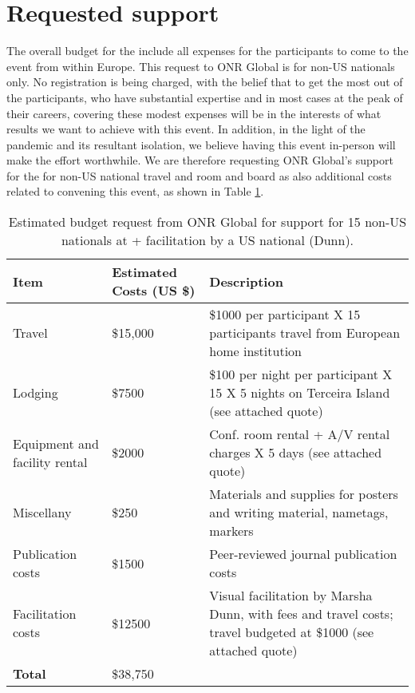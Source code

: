 \section{Requested  support}

The overall budget for the \symp include all expenses for the
participants to come to the event from within Europe. This request to
ONR Global is for non-US nationals only. No registration is being
charged, with the belief that to get the most out of the participants,
who have substantial expertise and in most cases at the peak of their
careers, covering these modest expenses will be in the interests of
what results we want to achieve with this event. In addition, in the
light of the pandemic and its resultant isolation, we believe having
this event in-person will make the effort worthwhile.  We are
therefore requesting ONR Global's support for the \symp for non-US
national travel and room and board as also additional costs related to
convening this event, as shown in Table \ref{tab:nsf-budget}.

\begin{table}[!h]
  \footnotesize{
    \centering    
    \begin{tabular}{|p{3.0cm}|p{1.6cm}|p{10cm}|}
      \hline 
      \rowcolor{Gray}
      \bfseries Item& \bfseries Estimated Costs (US \$)&\bfseries Description\\
      \hline
      Travel & \$15,000 & \$1000 per participant X 15 participants
                          travel from European home institution\\ 
      \hline
      Lodging& \$7500 & \$100 per night per participant X 15 X 5
                        nights on Terceira Island (see attached quote)\\
      \hline
      Equipment and facility rental &\$2000 & Conf. room rental + A/V
                                              rental charges X 5 days
                                              (see attached quote)\\
      \hline
      Miscellany& \$250 & Materials and supplies for posters and writing material,
                          nametags, markers\\
      \hline
      Publication costs& \$1500 & Peer-reviewed journal publication
                                  costs\\
      \hline
      Facilitation costs& \$12500 & Visual facilitation by Marsha
                                    Dunn, with fees and travel
                                    costs; travel budgeted at \$1000 (see attached quote)\\
      \hline
      \textbf{Total}& \$38,750&\\
      \hline        
  \end{tabular}
  \caption{Estimated budget request from ONR Global for support for 15
    non-US nationals at \sympe + facilitation by a US national (Dunn).}
  \label{tab:nsf-budget}
}
\end{table}

